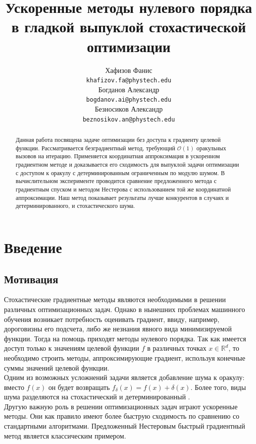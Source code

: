 \documentclass{article}
\title{Ускоренные методы нулевого порядка в гладкой выпуклой стохастической оптимизации}
\author{
	Хафизов Фанис \\
	\texttt{khafizov.fa@phystech.edu} \\
	\And
	Богданов Александр \\
	\texttt{bogdanov.ai@phystech.edu} \\
	\And
	Безносиков Александр \\
	\texttt{beznosikov.an@phystech.edu}
}
\date{}
\begin{document}
\maketitle

\begin{abstract}
Данная работа посвящена задаче оптимизации без доступа к градиенту целевой функции. Рассматривается безградиентный метод, требующий $\mathcal{O}(1)$ оракульных вызовов на итерацию. Применяется координатная аппроксимация в ускоренном градиентном методе и доказывается его сходимость для выпуклой задачи оптимизации с доступом к оракулу с детерминированным ограниченным по модулю шумом. В вычислительном эксперименте проводится сравнение предложенного метода с градиентным спуском и методом Нестерова с использованием той же координатной аппроксимации. Наш метод показывает результаты лучше конкурентов в случаях и детерминированного, и стохастического шума.

\end{abstract}


\section{Введение}
\subsection{Мотивация}
Стохастические градиентные методы являются необходимыми в решении различных оптимизационных задач. Однако в нынешних проблемах машинного обучения возникает потребность оценивать градиент, ввиду, например, дороговизны его подсчета, либо же незнания явного вида минимизируемой функции. Тогда на помощь приходят методы нулевого порядка. Так как имеется доступ только к значениям целевой функции $f$ в различных точках $x \in \mathbb{R}^d$, то необходимо строить методы, аппроксимирующие градиент, используя конечные суммы значений целевой функции.\\
Одним из возможных усложнений задачи является добавление шума к оракулу: вместо $f(x)$ он будет возвращать $f_\delta(x) = f(x) + \delta (x)$. Более того, виды шума разделяются на стохастический \cite{lucchi2022theoretical} и детерминированный \cite{lobanov2023zeroorder}.\\
Другую важную роль в решении оптимизационных задач играют ускоренные методы. Они как правило имеют более быструю сходимость по сравнению со стандартными алгоритмами. Предложенный Нестеровым \cite{Nesterov1983AMF} быстрый градиентный метод является классическим примером.
\end{document}
